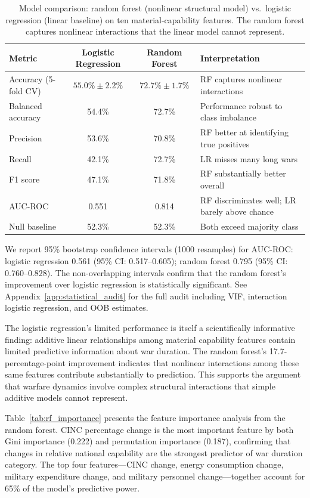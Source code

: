 \begin{table}[ht]
\centering
\caption{Model comparison: random forest (nonlinear structural model) vs.\ logistic regression (linear baseline) on ten material-capability features. The random forest captures nonlinear interactions that the linear model cannot represent.}
\label{tab:model_comparison}
\begin{tabularx}{\textwidth}{@{}l c c X@{}}
\toprule
\textbf{Metric} & \textbf{Logistic Regression} & \textbf{Random Forest} & \textbf{Interpretation} \\
\midrule
Accuracy (5-fold CV) & $55.0\% \pm 2.2\%$ & $72.7\% \pm 1.7\%$ & RF captures nonlinear interactions \\
Balanced accuracy & 54.4\% & 72.7\% & Performance robust to class imbalance \\
Precision & 53.6\% & 70.8\% & RF better at identifying true positives \\
Recall & 42.1\% & 72.7\% & LR misses many long wars \\
F1 score & 47.1\% & 71.8\% & RF substantially better overall \\
AUC-ROC & 0.551 & 0.814 & RF discriminates well; LR barely above chance \\
Null baseline & 52.3\% & 52.3\% & Both exceed majority class \\
\bottomrule
\end{tabularx}
\end{table}

We report 95\% bootstrap confidence intervals (1000 resamples) for AUC-ROC: logistic regression 0.561 (95\% CI: 0.517--0.605); random forest 0.795 (95\% CI: 0.760--0.828). The non-overlapping intervals confirm that the random forest's improvement over logistic regression is statistically significant. See Appendix~\ref{app:statistical_audit} for the full audit including VIF, interaction logistic regression, and OOB estimates.

The logistic regression's limited performance is itself a scientifically informative finding: additive linear relationships among material capability features contain limited predictive information about war duration. The random forest's 17.7-percentage-point improvement indicates that nonlinear interactions among these same features contribute substantially to prediction. This supports the argument that warfare dynamics involve complex structural interactions that simple additive models cannot represent.

Table~\ref{tab:rf_importance} presents the feature importance analysis from the random forest. CINC percentage change is the most important feature by both Gini importance (0.222) and permutation importance (0.187), confirming that changes in relative national capability are the strongest predictor of war duration category. The top four features---CINC change, energy consumption change, military expenditure change, and military personnel change---together account for 65\% of the model's predictive power.

